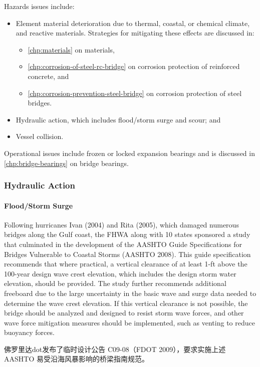 Hazards issues include:
\begin{itemize}
  \item Element material deterioration due to thermal, coastal, or chemical climate, and reactive materials.
  Strategies for mitigating these effects are discussed in:
  \begin{itemize}
    \item \cref{chp:materials} on materials,
    \item \cref{chp:corrosion-of-steel-rc-bridge} on corrosion protection of reinforced concrete, and
    \item \cref{chp:corrosion-prevention-steel-bridge} on corrosion protection of steel bridges.
  \end{itemize}
  \item Hydraulic action, which includes flood/storm surge and scour; and
  \item  Vessel collision.
\end{itemize}
Operational issues include frozen or locked expansion bearings and is discussed in \cref{chp:bridge-bearings} on bridge
bearings.

\subsubsection*{Hydraulic Action}
\paragraph*{Flood/Storm Surge}
Following hurricanes Ivan (2004) and Rita (2005), which damaged numerous bridges along the Gulf coast, the FHWA along with 10 states sponsored a study that culminated in the development of the AASHTO Guide Specifications for Bridges Vulnerable to Coastal Storms (AASHTO 2008). This guide specification recommends that where practical, a vertical clearance of at least 1-ft above the 100-year design wave crest elevation, which includes the design storm water elevation, should be provided. The study further recommends additional freeboard due to the large uncertainty in the basic wave and surge data needed to determine the wave crest elevation. If this vertical clearance is not possible, the bridge should be analyzed and designed to resist storm wave forces, and other wave force mitigation measures should be implemented, such as venting to reduce buoyancy forces.

佛罗里达\acrlong*{dot}发布了临时设计公告 C09-08（FDOT 2009），要求实施上述 AASHTO 易受沿海风暴影响的桥梁指南规范。


